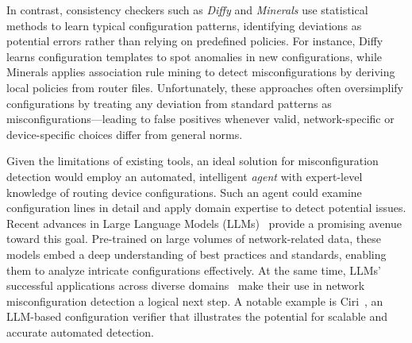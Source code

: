 In contrast, consistency checkers such as \textit{Diffy} \cite{kakarla2024diffy}
and \textit{Minerals} \cite{le2006minerals} use statistical methods to learn
typical configuration patterns, identifying deviations as potential errors rather
than relying on predefined policies. For instance, Diffy learns configuration
templates to spot anomalies in new configurations, while Minerals applies
association rule mining to detect misconfigurations by deriving local policies
from router files. Unfortunately, these approaches often oversimplify configurations
by treating any deviation from standard patterns as misconfigurations—leading
to false positives whenever valid, network-specific or device-specific choices
differ from general norms.

Given the limitations of existing tools, an ideal solution for misconfiguration
detection would employ an automated, intelligent \emph{agent} with expert-level
knowledge of routing device configurations. Such an agent could examine configuration
lines in detail and apply domain expertise to detect potential issues. Recent
advances in Large Language Models
(LLMs)~\cite{bogdanov2024leveraging,chen2024automatic,wang2024identifying,liu2024large,
	wang2024netconfeval} provide a promising avenue toward this goal. Pre-trained on
large volumes of network-related data, these models embed a deep understanding of
best practices and standards, enabling them to analyze intricate configurations
effectively. At the same time, LLMs' successful applications across diverse
domains~\cite{carion2020end,sheng2019nrtr,neil2020transformers,parmar2018image,
	chen2021developing,gulati2020conformer} make their use in network misconfiguration
detection a logical next step. A notable example is
Ciri~\cite{lian2023configuration}, an LLM-based configuration verifier that
illustrates the potential for scalable and accurate automated detection.

